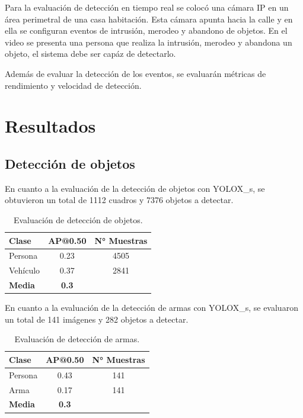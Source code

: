 \documentclass[11pt,a4paper]{article}
\begin{document}
Para la evaluación de detección en tiempo real se colocó una cámara IP en un área perimetral de una casa habitación. Esta cámara apunta hacia la calle y en ella se configuran eventos de intrusión, merodeo y abandono de objetos. En el video se presenta una persona que realiza la intrusión, merodeo y abandona un objeto, el sistema debe ser capáz de detectarlo.

Además de evaluar la detección de los eventos, se evaluarán métricas de rendimiento y velocidad de detección.

\section{Resultados}

\subsection{Detección de objetos}

En cuanto a la evaluación de la detección de objetos con YOLOX\_s, se obtuvieron un total de 1112 cuadros y 7376 objetos a detectar.

\begin{table}
    \centering
    \begin{tabular}{lcc}
        \toprule
        Clase          & AP@0.50      & N° Muestras \\
        \midrule
        Persona        & 0.23         & 4505        \\
        Vehículo       & 0.37         & 2841        \\
        \textbf{Media} & \textbf{0.3} &             \\
        \bottomrule
    \end{tabular}
    \caption{Evaluación de detección de objetos.}
\end{table}

En cuanto a la evaluación de la detección de armas con YOLOX\_s, se evaluaron un total de 141 imágenes y 282 objetos a detectar.

\begin{table}
    \centering
    \begin{tabular}{lcc}
        \toprule
        Clase          & AP@0.50      & N° Muestras \\
        \midrule
        Persona        & 0.43         & 141         \\
        Arma           & 0.17         & 141         \\
        \textbf{Media} & \textbf{0.3} &             \\
        \bottomrule
    \end{tabular}
    \caption{Evaluación de detección de armas.}
\end{table}
\end{document}

